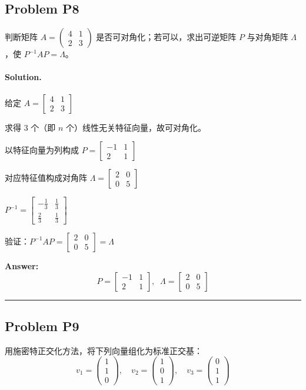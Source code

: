 \documentclass[12pt, a4paper]{article}
\newcommand{\problem}[1]{\subsection*{Problem #1}}
\newcommand{\solution}{\paragraph{Solution.}}
\begin{document}
\problem{P8}

判断矩阵 $A = \begin{pmatrix} 4 & 1 \\ 2 & 3 \end{pmatrix}$ 是否可对角化；若可以，求出可逆矩阵 $P$ 与对角矩阵 $\Lambda$，使 $P^{-1}AP = \Lambda$。

\solution


给定 $A = \left[\begin{matrix}4 & 1\\2 & 3\end{matrix}\right]$

求得 $3$ 个（即 $n$ 个）线性无关特征向量，故可对角化。

以特征向量为列构成 $P = \left[\begin{matrix}-1 & 1\\2 & 1\end{matrix}\right]$

对应特征值构成对角阵 $\Lambda = \left[\begin{matrix}2 & 0\\0 & 5\end{matrix}\right]$

$P^{-1} = \left[\begin{matrix}- \frac{1}{3} & \frac{1}{3}\\\frac{2}{3} & \frac{1}{3}\end{matrix}\right]$

验证：$P^{-1}AP = \left[\begin{matrix}2 & 0\\0 & 5\end{matrix}\right] = \Lambda$

\textbf{Answer:}
\[P = \left[\begin{matrix}-1 & 1\\2 & 1\end{matrix}\right],\;\; \Lambda = \left[\begin{matrix}2 & 0\\0 & 5\end{matrix}\right]\]


\vspace{1em}
\hrule
\vspace{1em}

\problem{P9}

用施密特正交化方法，将下列向量组化为标准正交基：
   $$v_1 = \begin{pmatrix} 1 \\ 1 \\ 0 \end{pmatrix}, \quad
   v_2 = \begin{pmatrix} 1 \\ 0 \\ 1 \end{pmatrix}, \quad
   v_3 = \begin{pmatrix} 0 \\ 1 \\ 1 \end{pmatrix}$$
\end{document}
